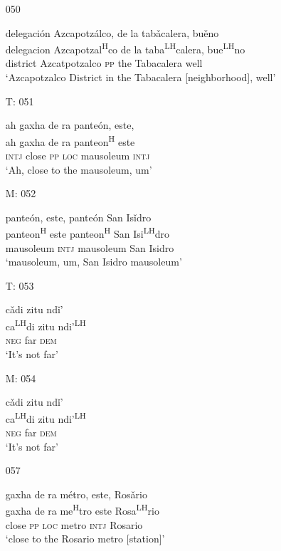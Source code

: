 \begin{itemize}
\item[050]
 
\glll   delegaci\'{o}n Azcapotz\'{a}lco, de la tab\v{a}calera, bu\v{e}no\\
delegacion Azcapotzal\textsuperscript{H}co de la taba\textsuperscript{LH}calera, bue\textsuperscript{LH}no\\
district Azcatpotzalco \textsc{pp} the Tabacalera well\\
\glt `Azcapotzalco District in the Tabacalera [neighborhood], well'
 



\item[T: 051]
 
\glll   ah gaxha de ra pante\'{o}n, este, \\
ah gaxha de ra panteon\textsuperscript{H} este\\
\textsc{intj} close \textsc{pp} \textsc{loc} mausoleum \textsc{intj}\\
\glt `Ah, close to the mausoleum, um'
 

\item[M: 052]
 
\glll   pante\'{o}n, este, pante\'{o}n San Is\v{i}dro\\
panteon\textsuperscript{H} este panteon\textsuperscript{H} San Isi\textsuperscript{LH}dro\\
mausoleum \textsc{intj} mausoleum San Isidro\\
\glt `mausoleum, um, San Isidro mausoleum'
 


\item[T: 053]
 
\glll   c\v{a}di zitu nd\v{i}'\\
ca\textsuperscript{LH}di zitu ndi'\textsuperscript{LH}\\
\textsc{neg} far \textsc{dem}\\
\glt `It's not far'
 


\item[M: 054]
 
\glll   c\v{a}di zitu nd\v{i}'\\
ca\textsuperscript{LH}di zitu ndi'\textsuperscript{LH}\\
\textsc{neg} far \textsc{dem}\\
\glt `It's not far'
 


\item[057]
 
\glll   gaxha de ra m\'{e}tro, este, Ros\v{a}rio\\
gaxha de ra me\textsuperscript{H}tro este Rosa\textsuperscript{LH}rio\\
close \textsc{pp} \textsc{loc} metro \textsc{intj} Rosario\\
\glt `close to the Rosario metro [station]' 
 


\end{itemize}
